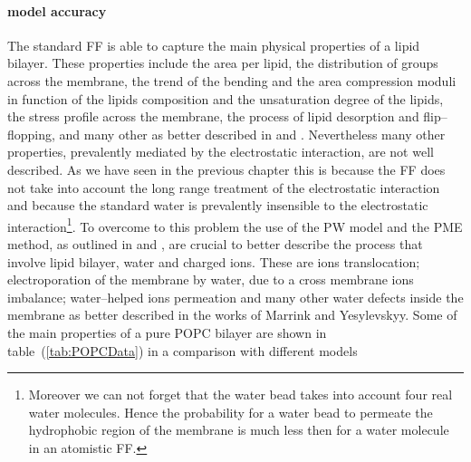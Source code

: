 \paragraph{\textbf{model accuracy}} The standard \martini \ac{FF} is able to capture the main physical properties 
of a lipid bilayer. These properties include the area per lipid, the distribution of groups across the membrane, 
the trend of the bending and the area compression moduli in function of the lipids composition and the 
unsaturation degree of the lipids, the stress profile across the membrane, the process of lipid desorption and 
flip--flopping, and many other as better described in \cite{Martini} and \cite{MartiniReview}. Nevertheless many 
other properties, prevalently mediated by the electrostatic interaction, are not well described. As we have seen 
in the previous chapter this is because the \martini \ac{FF} does not take into account the long range treatment 
of the electrostatic interaction and because the standard \martini water is prevalently insensible to the 
electrostatic interaction\footnote{Moreover we can not forget that the \martini water bead takes into account 
four real water molecules. Hence the probability for a \martini water bead to permeate the hydrophobic region of 
the membrane is much less then for a water molecule in an atomistic \ac{FF}.}. To overcome to this problem the 
use of the \ac{PW} model and the \ac{PME} method, as outlined in \cite{MartiniReview} and \cite{PW}, are crucial 
to better describe the process that involve lipid bilayer, water and charged ions. These are ions translocation; 
electroporation of the membrane by water, due to a cross membrane ions imbalance; water--helped ions permeation 
and many other water defects inside the membrane as better described in the works of Marrink and Yesylevskyy. Some of the main properties of a pure \ac{POPC} bilayer are shown in table~(\ref{tab:POPCData}) in a comparison with different models
